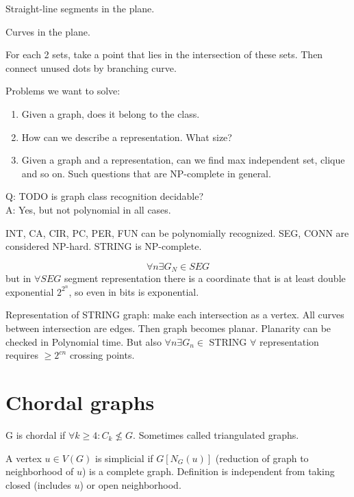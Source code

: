 \begin{definition}
	Straight-line segments in the plane.
\end{definition}

\begin{definition}
	Curves in the plane.
\end{definition}

For each 2 sets, take a point that lies in the intersection of these sets.
Then connect unused dots by branching curve.

Problems we want to solve:
\begin{enumerate}
	\item Given a graph, does it belong to the class.
	\item How can we describe a representation. What size?
	\item Given a graph and a representation, can we find max independent set, clique and so on.
	Such questions that are NP-complete in general.
\end{enumerate}

Q: TODO is graph class recognition decidable?\\
A: Yes, but not polynomial in all cases.

INT, CA, CIR, PC, PER, FUN can be polynomially recognized.
SEG, CONN are considered NP-hard.
STRING is NP-complete.

\[ \forall n \exists G_N \in SEG\]
but in $\forall SEG$ segment representation there is a coordinate that is at least double exponential $2^{2^n}$, so even in bits is exponential.

Representation of STRING graph: make each intersection as a vertex.
All curves between intersection are edges.
Then graph becomes planar.
Planarity can be checked in Polynomial time.
But also $\forall n \exists G_n \in $ STRING $\forall$ representation requires $\geq 2^{cn}$ crossing points.

\section{Chordal graphs}

\begin{definition}
	G is chordal if $\forall k \geq 4: C_k \not\leq G$.
	Sometimes called triangulated graphs.
\end{definition}

\begin{definition}[Simplicial]
	A vertex $u \in V(G)$ is simplicial  if $G[N_G(u)]$ (reduction of graph to neighborhood of $u$) is a complete graph.
	Definition is independent from taking closed (includes $u$) or open neighborhood.
\end{definition}

